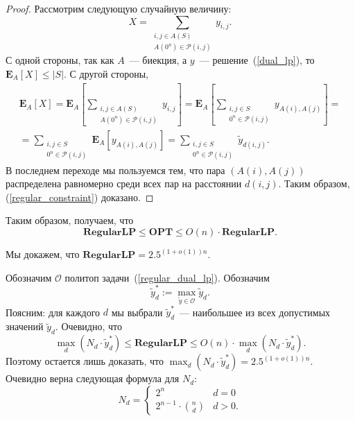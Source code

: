 \documentclass[12pt]{article}
\newcommand{\abs}[1]{\left|#1\right|}
\newcommand{\Oc}{\mathcal{O}}
\newcommand{\Pc}{\mathcal{P}}
\newcommand{\Exp}[2]{\mathbf{E}_{#1}\left[#2\right]}
\begin{document}
\begin{proof}
        Рассмотрим следующую случайную величину:
        $$
            X = \sum_{\begin{smallmatrix}
                i, j \in A(S) \\
                A(0^n) \in \Pc(i, j)
            \end{smallmatrix}} y_{i,j}.
        $$
        С одной стороны, так как $A$~--- биекция, а $y$~--- решение~(\ref{dual_lp}),
        то $\Exp{A}{X} \leq \abs{S}$.
        С другой стороны,
        \begin{eqnarray*}
            \Exp{A}{X} = \Exp{A}{
            \sum_{\begin{smallmatrix}
                i, j \in A(S) \\
                A(0^n) \in \Pc(i, j)
            \end{smallmatrix}} y_{i,j}
            } =  \Exp{A}{
            \sum_{\begin{smallmatrix}
                i, j \in S \\
                0^n \in \Pc(i, j)
            \end{smallmatrix}} y_{A(i),A(j)}
            } =\\= \sum_{\begin{smallmatrix}i, j \in S \\
                0^n \in \Pc(i, j)\end{smallmatrix}} \Exp{A}{y_{A(i),A(j)}} = 
                \sum_{\begin{smallmatrix}i,j \in S \\ 0^n \in \Pc(i, j)
                    \end{smallmatrix}} \tilde{y}_{d(i,j)}.
        \end{eqnarray*}
        В последнем переходе мы пользуемся тем, что пара $(A(i), A(j))$
        распределена равномерно среди всех пар на расстоянии $d(i, j)$.
        Таким образом, (\ref{regular_constraint}) доказано.
    \end{proof}

    Таким образом, получаем, что
    $$
        \mathbf{RegularLP} \leq \mathbf{OPT} \leq O(n) \cdot \mathbf{RegularLP}.
    $$

    Мы докажем, что $\mathbf{RegularLP} = 2.5^{(1+o(1))n}$.

    Обозначим $\Oc$ политоп задачи~(\ref{regular_dual_lp}).
    Обозначим 
    $$
        \tilde{y}_d^* := \max_{\tilde{y} \in \Oc} \tilde{y}_d.
    $$
    Поясним: для каждого $d$ мы выбрали $\tilde{y}_d^*$~--- наибольшее из всех допустимых значений $\tilde{y}_d$.  Очевидно, что
    $$
        \max_d (N_d \cdot \tilde{y}_d^*) \leq \mathbf{RegularLP} \leq O(n) \cdot \max_d (N_d \cdot \tilde{y}_d^*).
    $$
    Поэтому остается лишь доказать, что $\max_d (N_d \cdot \tilde{y}_d^*) = 2.5^{(1 + o(1)) n}$.
    Очевидно верна следующая формула для $N_d$:
    $$
        N_d = \begin{cases}
            2^n & d = 0 \\
            2^{n-1} \cdot \binom{n}{d} & d > 0.
        \end{cases}
    $$
\end{document}
